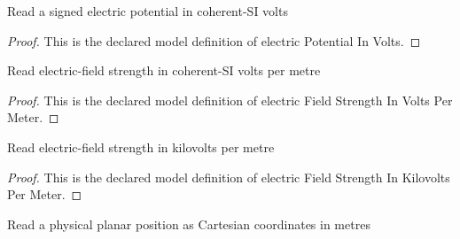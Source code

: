 \begin{definition}
  \label{def:physics:phyx-mini-0870:phyxminiproblems-problemphyxmini0870-electricpotentialinvolts}
  Read a signed electric potential in coherent-SI volts
\end{definition}
\begin{proof}
  This is the declared model definition of electric Potential In Volts.
\end{proof}
\begin{definition}
  \label{def:physics:phyx-mini-0870:phyxminiproblems-problemphyxmini0870-electricfieldstrengthinvoltspermeter}
  Read electric-field strength in coherent-SI volts per metre
\end{definition}
\begin{proof}
  This is the declared model definition of electric Field Strength In Volts Per Meter.
\end{proof}
\begin{definition}
  \label{def:physics:phyx-mini-0870:phyxminiproblems-problemphyxmini0870-electricfieldstrengthinkilovoltspermeter}
  Read electric-field strength in kilovolts per metre
\end{definition}
\begin{proof}
  This is the declared model definition of electric Field Strength In Kilovolts Per Meter.
\end{proof}
\begin{definition}
  \label{def:physics:phyx-mini-0870:phyxminiproblems-problemphyxmini0870-positionvectorinmeters}
  Read a physical planar position as Cartesian coordinates in metres
\end{definition}
